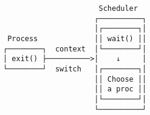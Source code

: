 \documentclass[varwidth,crop]{standalone}
\begin{document}
\begin{verbatim}
                      Scheduler
                     ┌──────────┐
                     │┌────────┐│
 Process             ││ wait() ││
┌────────┐  context  │└────────┘│
│ exit() ├──────────>│    ↓     │
└────────┘  switch   │┌────────┐│
                     ││ Choose ││
                     ││ a proc ││
                     │└────────┘│
                     └──────────┘
\end{verbatim}
\end{document}
